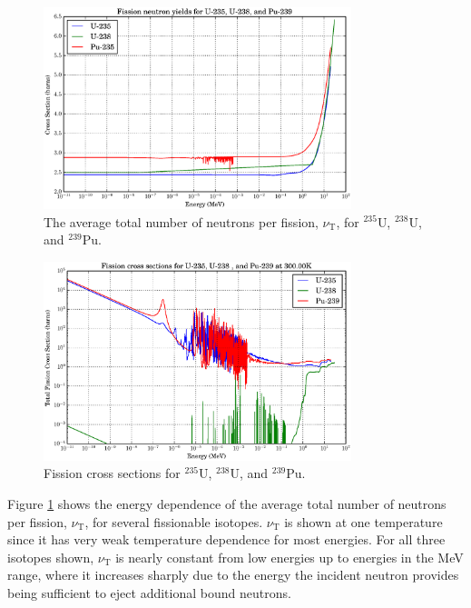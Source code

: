 
\begin{figure}[h!]
  \centering
    \includegraphics[width=0.8\textwidth]{graphics/nu_compare.eps}
     \caption{The average total number of neutrons per fission, $\nu_\mathrm{T}$, for $^{235}$U, $^{238}$U, and $^{239}$Pu. \label{nu_compare}}
\end{figure}

\begin{figure}[h!]
  \centering
    \includegraphics[width=0.8\textwidth]{graphics/xs_fissile.eps}
     \caption{Fission cross sections for $^{235}$U, $^{238}$U, and  $^{239}$Pu. \label{xs_fission_only}}
\end{figure}

Figure \ref{nu_compare} shows the energy dependence of the average total number of neutrons per fission, $\nu_\mathrm{T}$, for several fissionable isotopes.  $\nu_\mathrm{T}$ is shown at one temperature since it has very weak temperature dependence for most energies.   For all three isotopes shown, $\nu_\mathrm{T}$ is nearly constant from low energies up to energies in the MeV range, where it increases sharply due to the energy the incident neutron provides being sufficient to eject additional bound neutrons.  

